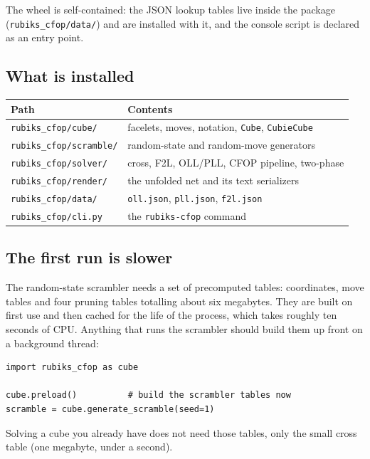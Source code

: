 The wheel is self-contained: the JSON lookup tables live inside the package
(\texttt{rubiks\_cfop/data/}) and are installed with it, and the console script is
declared as an entry point.

\subsection{What is installed}

\begin{center}
\begin{tabular}{@{}ll@{}}
\toprule
Path & Contents \\
\midrule
\texttt{rubiks\_cfop/cube/} & facelets, moves, notation, \texttt{Cube}, \texttt{CubieCube} \\
\texttt{rubiks\_cfop/scramble/} & random-state and random-move generators \\
\texttt{rubiks\_cfop/solver/} & cross, F2L, OLL/PLL, CFOP pipeline, two-phase \\
\texttt{rubiks\_cfop/render/} & the unfolded net and its text serializers \\
\texttt{rubiks\_cfop/data/} & \texttt{oll.json}, \texttt{pll.json}, \texttt{f2l.json} \\
\texttt{rubiks\_cfop/cli.py} & the \texttt{rubiks-cfop} command \\
\bottomrule
\end{tabular}
\end{center}

\subsection{The first run is slower}

The random-state scrambler needs a set of precomputed tables: coordinates, move
tables and four pruning tables totalling about six megabytes.  They are built on
first use and then cached for the life of the process, which takes roughly ten
seconds of CPU.  Anything that runs the scrambler should build them up front on a
background thread:

\begin{lstlisting}[style=python]
import rubiks_cfop as cube

cube.preload()          # build the scrambler tables now
scramble = cube.generate_scramble(seed=1)
\end{lstlisting}

Solving a cube you already have does not need those tables, only the small cross
table (one megabyte, under a second).
